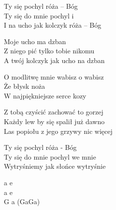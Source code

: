 \begin{text}
    Ty się pochyl róża – Bóg\\
    Ty się do mnie pochyl i\\
    I na ucho jak kolczyk róża – Bóg

    Moje ucho ma dzban\\
    Z niego pić tylko tobie nikomu\\
    A twój kolczyk jak ucho na dzban

    O modlitwę mnie wabisz o wabisz\\
    Że błysk noża\\
    W najpiękniejsze serce kozy

    Z tobą czyścić zachować to gorzej\\
    Każdy lew by się spalił już dawno\\
    Las popiołu z jego grzywy nic więcej

    Ty się pochyl róża - Bóg\\
    Ty się do mnie pochyl we mnie\\
    Wytryśniemy jak słońce wytryśnie
\end{text}
\begin{chord}
    a e\\
    a e\\
    G a (GaGa)
\end{chord}